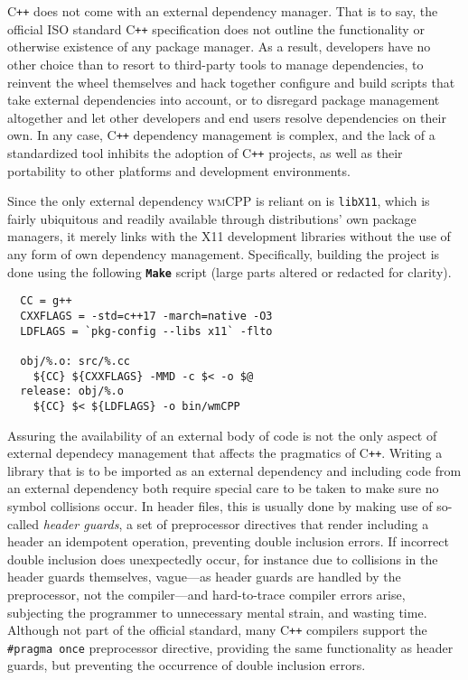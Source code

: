 C\texttt{++} does not come with an  external dependency manager. That is to say,
the  official  ISO  standard C\texttt{++}  specification\cite{cppstd}  does  not
outline the  functionality or otherwise existence  of any package manager.  As a
result, developers have  no other choice than to resort  to third-party tools to
manage  dependencies,  to  reinvent  the  wheel  themselves  and  hack  together
configure and build scripts that take  external dependencies into account, or to
disregard package management  altogether and let other developers  and end users
resolve  dependencies  on  their  own.  In  any  case,  C\texttt{++}  dependency
management is complex, and the lack of a standardized tool inhibits the adoption
of C\texttt{++}  projects, as well as  their portability to other  platforms and
development environments.

Since   the  only   external  dependency   \textsc{wmCPP}  is   reliant  on   is
\texttt{libX11},  which  is  fairly  ubiquitous and  readily  available  through
distributions'   own  package   managers,   it  merely   links   with  the   X11
development  libraries   without  the  use   of  any  form  of   own  dependency
management.  Specifically, building  the  project is  done  using the  following
\textbf{\texttt{Make}} script (large parts altered or redacted for clarity).

\begin{verbatim}
  CC = g++
  CXXFLAGS = -std=c++17 -march=native -O3
  LDFLAGS = `pkg-config --libs x11` -flto

  obj/%.o: src/%.cc
    ${CC} ${CXXFLAGS} -MMD -c $< -o $@
  release: obj/%.o
    ${CC} $< ${LDFLAGS} -o bin/wmCPP
\end{verbatim}

Assuring the availability of an external body  of code is not the only aspect of
external  dependecy  management that  affects  the  pragmatics of  C\texttt{++}.
Writing a library that is to be imported as an external dependency and including
code from an external  dependency both require special care to  be taken to make
sure no symbol collisions occur. In header files, this is usually done by making
use of so-called  \textit{header guards}, a set of  preprocessor directives that
render including a  header an idempotent operation,  preventing double inclusion
errors. If incorrect double inclusion  does unexpectedly occur, for instance due
to  collisions in  the header  guards themselves,  vague---as header  guards are
handled  by  the preprocessor,  not  the  compiler---and hard-to-trace  compiler
errors  arise,  subjecting the  programmer  to  unnecessary mental  strain,  and
wasting  time. Although  not part  of the  official standard,  many C\texttt{++}
compilers  support the  \texttt{#pragma once}  preprocessor  directive,
providing the same functionality as header guards, but preventing the occurrence
of double inclusion errors.

